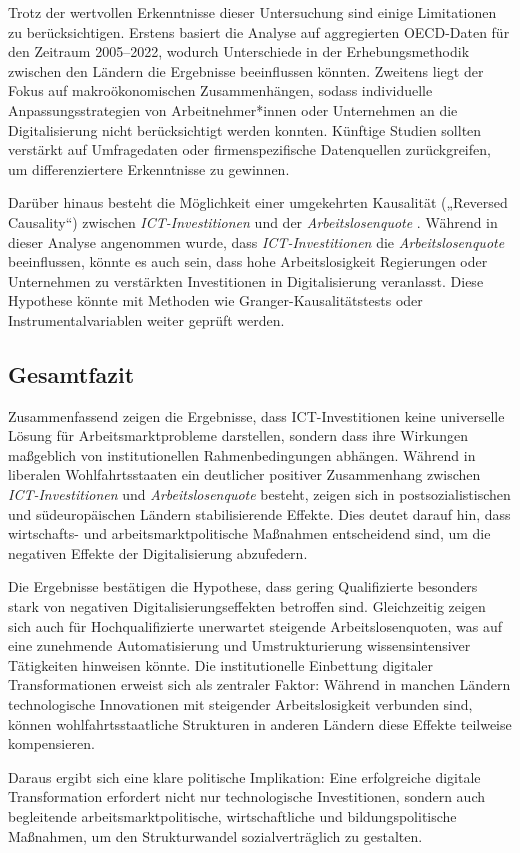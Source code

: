 Trotz der wertvollen Erkenntnisse dieser Untersuchung sind einige Limitationen zu 
berücksichtigen. Erstens basiert die Analyse auf aggregierten \ac{OECD}-Daten für den 
Zeitraum 2005–2022, wodurch Unterschiede in der Erhebungsmethodik zwischen den Ländern 
die Ergebnisse beeinflussen könnten. Zweitens liegt der Fokus auf makroökonomischen 
Zusammenhängen, sodass individuelle Anpassungsstrategien von Arbeitnehmer*innen oder 
Unternehmen an die Digitalisierung nicht berücksichtigt werden konnten. Künftige Studien 
sollten verstärkt auf Umfragedaten oder firmenspezifische Datenquellen zurückgreifen, um 
differenziertere Erkenntnisse zu gewinnen.

Darüber hinaus besteht die Möglichkeit einer umgekehrten Kausalität („Reversed Causality“) 
zwischen \textit{\ac{ICT}-Investitionen} und der \textit{Arbeitslosenquote} 
\parencite[S. 134]{pearl2009causality}. Während in dieser Analyse angenommen wurde, dass 
\textit{\ac{ICT}-Investitionen} die \textit{Arbeitslosenquote} beeinflussen, könnte es 
auch sein, dass hohe Arbeitslosigkeit Regierungen oder Unternehmen zu verstärkten 
Investitionen in Digitalisierung veranlasst. Diese Hypothese könnte mit Methoden wie 
Granger-Kausalitätstests oder Instrumentalvariablen weiter geprüft werden.

\subsection{Gesamtfazit}

Zusammenfassend zeigen die Ergebnisse, dass \ac{ICT}-Investitionen keine universelle 
Lösung für Arbeitsmarktprobleme darstellen, sondern dass ihre Wirkungen maßgeblich von 
institutionellen Rahmenbedingungen abhängen. Während in liberalen Wohlfahrtsstaaten ein 
deutlicher positiver Zusammenhang zwischen \textit{\ac{ICT}-Investitionen} und 
\textit{Arbeitslosenquote} besteht, zeigen sich in postsozialistischen und 
südeuropäischen Ländern stabilisierende Effekte. Dies deutet darauf hin, dass 
wirtschafts- und arbeitsmarktpolitische Maßnahmen entscheidend sind, um die negativen 
Effekte der Digitalisierung abzufedern.

Die Ergebnisse bestätigen die Hypothese, dass gering Qualifizierte besonders stark von 
negativen Digitalisierungseffekten betroffen sind. Gleichzeitig zeigen sich auch für 
Hochqualifizierte unerwartet steigende Arbeitslosenquoten, was auf eine zunehmende 
Automatisierung und Umstrukturierung wissensintensiver Tätigkeiten hinweisen könnte. Die 
institutionelle Einbettung digitaler Transformationen erweist sich als zentraler Faktor: 
Während in manchen Ländern technologische Innovationen mit steigender Arbeitslosigkeit 
verbunden sind, können wohlfahrtsstaatliche Strukturen in anderen Ländern diese Effekte 
teilweise kompensieren.

Daraus ergibt sich eine klare politische Implikation: Eine erfolgreiche digitale 
Transformation erfordert nicht nur technologische Investitionen, sondern auch begleitende 
arbeitsmarktpolitische, wirtschaftliche und bildungspolitische Maßnahmen, um den 
Strukturwandel sozialverträglich zu gestalten.

